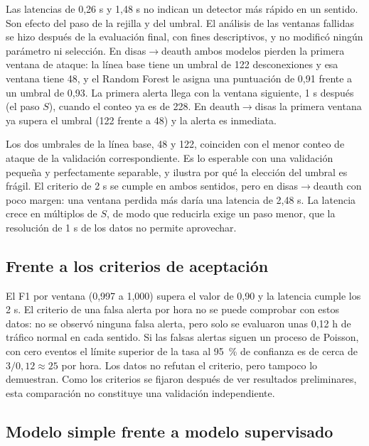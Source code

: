 \documentclass[journal]{IEEEtran}
\begin{document}
Las latencias de 0,26 s y 1,48 s no indican un detector más rápido en un sentido. Son efecto del paso de la rejilla y del umbral. El análisis de las ventanas fallidas se hizo después de la evaluación final, con fines descriptivos, y no modificó ningún parámetro ni selección. En disas$\rightarrow$deauth ambos modelos pierden la primera ventana de ataque: la línea base tiene un umbral de 122 desconexiones y esa ventana tiene 48, y el Random Forest le asigna una puntuación de 0,91 frente a un umbral de 0,93. La primera alerta llega con la ventana siguiente, 1 s después (el paso $S$), cuando el conteo ya es de 228. En deauth$\rightarrow$disas la primera ventana ya supera el umbral (122 frente a 48) y la alerta es inmediata.

Los dos umbrales de la línea base, 48 y 122, coinciden con el menor conteo de ataque de la validación correspondiente. Es lo esperable con una validación pequeña y perfectamente separable, y ilustra por qué la elección del umbral es frágil. El criterio de 2 s se cumple en ambos sentidos, pero en disas$\rightarrow$deauth con poco margen: una ventana perdida más daría una latencia de 2,48 s. La latencia crece en múltiplos de $S$, de modo que reducirla exige un paso menor, que la resolución de 1 s de los datos no permite aprovechar.

\subsection{Frente a los criterios de aceptación}

El F1 por ventana (0,997 a 1,000) supera el valor de 0,90 y la latencia cumple los 2 s. El criterio de una falsa alerta por hora no se puede comprobar con estos datos: no se observó ninguna falsa alerta, pero solo se evaluaron unas 0,12 h de tráfico normal en cada sentido. Si las falsas alertas siguen un proceso de Poisson, con cero eventos el límite superior de la tasa al 95~\% de confianza es de cerca de $3/0{,}12 \approx 25$ por hora. Los datos no refutan el criterio, pero tampoco lo demuestran. Como los criterios se fijaron después de ver resultados preliminares, esta comparación no constituye una validación independiente.

\subsection{Modelo simple frente a modelo supervisado}
\end{document}
